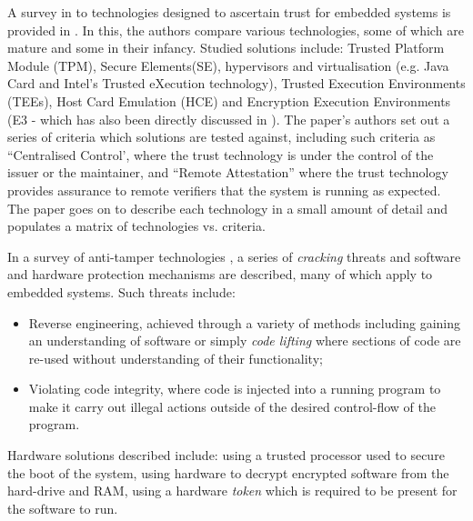 A survey in to technologies designed to ascertain trust for embedded systems is provided in \cite{Shepherd2016}. In this, the authors compare various technologies, some of which are mature and some in their infancy. Studied solutions include: Trusted Platform Module (TPM), Secure Elements(SE), hypervisors and virtualisation (e.g. Java Card and Intel's Trusted eXecution technology), Trusted Execution Environments (TEEs), Host Card Emulation (HCE) and Encryption Execution Environments (E3 - which has also been directly discussed in \cite{Lee2016}). The paper's authors set out a series of criteria which solutions are tested against, including such criteria as ``Centralised Control', where the trust technology is under the control of the issuer or the maintainer, and ``Remote Attestation'' where the trust technology provides assurance to remote verifiers that the system is running as expected. The paper goes on to describe each technology in a small amount of detail and populates a matrix of technologies vs. criteria. 

In a survey of anti-tamper technologies \cite{Bryant2004}, a series of \textit{cracking} threats and software and hardware protection mechanisms are described, many of which apply to embedded systems. Such threats include: 
\begin{itemize}
	\item Reverse engineering, achieved through a variety of methods including gaining an understanding	of software or simply \textit{code lifting} where sections of code are re-used without understanding of their functionality;
	\item Violating code integrity, where code is injected into a running program to make it carry out illegal actions outside of the desired control-flow of the program.
\end{itemize} 
Hardware solutions described include: using a trusted processor used to secure the boot of the system, using hardware to decrypt encrypted software from the hard-drive and RAM, using a hardware \textit{token} which is required to be present for the software to run.

